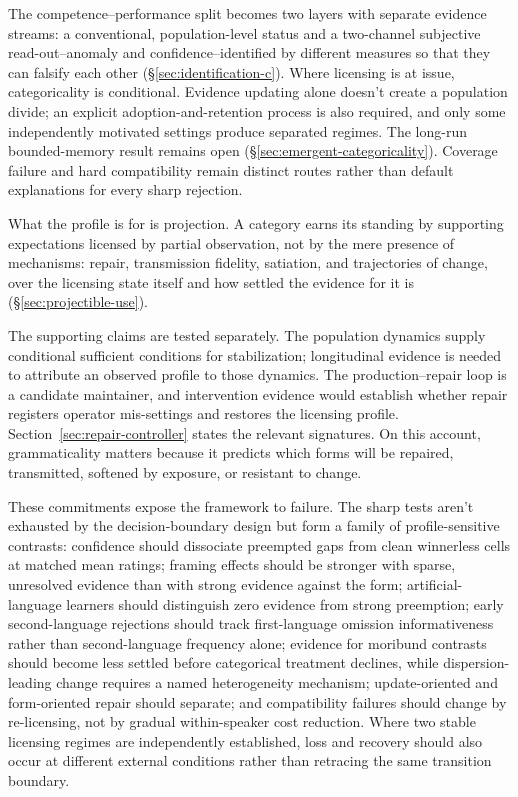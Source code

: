 \documentclass[12pt,letterpaper]{article}
\begin{document}
The competence--performance split becomes two layers with separate evidence
streams: a conventional, population-level status and a two-channel subjective
read-out--anomaly and confidence--identified by different measures so that they
can falsify each other (\S\ref{sec:identification-c}). Where licensing is at
issue, categoricality is conditional. Evidence updating alone doesn't create a
population divide; an explicit adoption-and-retention process is also required,
and only some independently motivated settings produce separated regimes. The
long-run bounded-memory result remains open (\S\ref{sec:emergent-categoricality}).
Coverage failure and hard compatibility remain distinct routes rather than
default explanations for every sharp rejection.

What the profile is for is projection. A category earns its standing by
supporting expectations licensed by partial observation, not by the mere
presence of mechanisms: repair, transmission fidelity, satiation, and
trajectories of change, over the licensing state itself and how settled the
evidence for it is (\S\ref{sec:projectible-use}).

The supporting claims are tested separately. The population dynamics supply
conditional sufficient conditions for stabilization; longitudinal evidence is
needed to attribute an observed profile to those dynamics. The
production--repair loop is a candidate maintainer, and intervention evidence
would establish whether repair registers operator mis-settings and restores the
licensing profile. Section~\ref{sec:repair-controller} states the relevant
signatures. On this account,
grammaticality matters because it predicts which forms will be repaired,
transmitted, softened by exposure, or resistant to change.

These commitments expose the framework to failure. The sharp tests aren't
exhausted by the decision-boundary design but form a family of profile-sensitive
contrasts: confidence should dissociate preempted gaps from clean winnerless
cells at matched mean ratings; framing effects should be stronger with sparse,
unresolved evidence than with strong evidence against the form;
artificial-language learners should
distinguish zero evidence from strong preemption; early second-language
rejections should track first-language omission informativeness rather than
second-language frequency alone; evidence for moribund contrasts should become
less settled before categorical treatment declines, while dispersion-leading
change requires a named heterogeneity mechanism; update-oriented and
form-oriented repair should
separate; and compatibility failures should change by re-licensing, not by
gradual within-speaker cost reduction. Where two stable licensing regimes are
independently established, loss and recovery should also occur at different
external conditions rather than retracing the same transition boundary.
\end{document}
